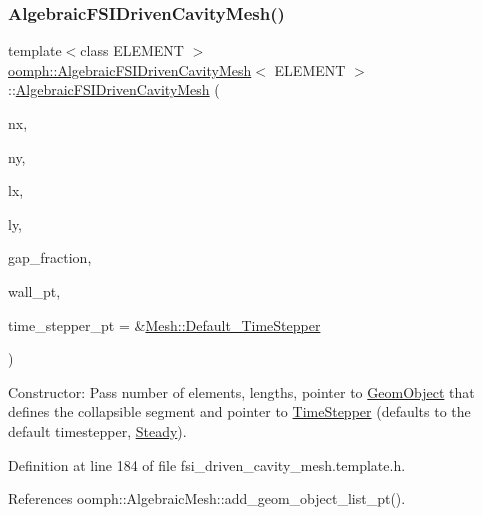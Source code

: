 \subsubsection{\texorpdfstring{Algebraic\+F\+S\+I\+Driven\+Cavity\+Mesh()}{AlgebraicFSIDrivenCavityMesh()}}
{\footnotesize\ttfamily template$<$class E\+L\+E\+M\+E\+NT $>$ \\
\hyperlink{classoomph_1_1AlgebraicFSIDrivenCavityMesh}{oomph\+::\+Algebraic\+F\+S\+I\+Driven\+Cavity\+Mesh}$<$ E\+L\+E\+M\+E\+NT $>$\+::\hyperlink{classoomph_1_1AlgebraicFSIDrivenCavityMesh}{Algebraic\+F\+S\+I\+Driven\+Cavity\+Mesh} (\begin{DoxyParamCaption}\item[{const unsigned \&}]{nx,  }\item[{const unsigned \&}]{ny,  }\item[{const double \&}]{lx,  }\item[{const double \&}]{ly,  }\item[{const double \&}]{gap\+\_\+fraction,  }\item[{\hyperlink{classoomph_1_1GeomObject}{Geom\+Object} $\ast$}]{wall\+\_\+pt,  }\item[{\hyperlink{classoomph_1_1TimeStepper}{Time\+Stepper} $\ast$}]{time\+\_\+stepper\+\_\+pt = {\ttfamily \&\hyperlink{classoomph_1_1Mesh_a12243d0fee2b1fcee729ee5a4777ea10}{Mesh\+::\+Default\+\_\+\+Time\+Stepper}} }\end{DoxyParamCaption})\hspace{0.3cm}{\ttfamily [inline]}}



Constructor\+: Pass number of elements, lengths, pointer to \hyperlink{classoomph_1_1GeomObject}{Geom\+Object} that defines the collapsible segment and pointer to \hyperlink{classoomph_1_1TimeStepper}{Time\+Stepper} (defaults to the default timestepper, \hyperlink{classoomph_1_1Steady}{Steady}). 



Definition at line 184 of file fsi\+\_\+driven\+\_\+cavity\+\_\+mesh.\+template.\+h.



References oomph\+::\+Algebraic\+Mesh\+::add\+\_\+geom\+\_\+object\+\_\+list\+\_\+pt().

\mbox{\label{classoomph_1_1AlgebraicFSIDrivenCavityMesh_a048a142aff0ca5fd62273f756bce4ab6}} 
